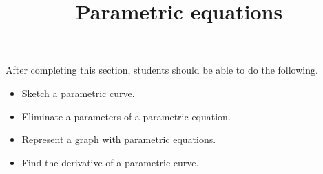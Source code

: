 \documentclass{ximera}
\title{Parametric equations}
\begin{document}
\begin{abstract}
\end{abstract}

\maketitle

\begin{sectionOutcomes}

After completing this section, students should be able to do the following.

\begin{itemize}
\item Sketch a parametric curve.
\item Eliminate a parameters of a parametric equation.
\item Represent a graph with parametric equations.
\item Find the derivative of a parametric curve.
\end{itemize}

\end{sectionOutcomes}
\end{document}
